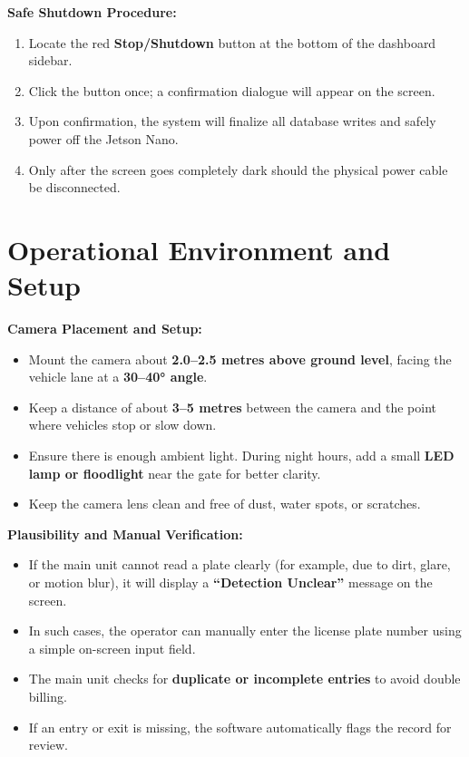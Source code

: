 \noindent\textbf{Safe Shutdown Procedure:}
\begin{enumerate}
	\item Locate the red \textbf{Stop/Shutdown} button at the bottom of the dashboard sidebar.
	\item Click the button once; a confirmation dialogue will appear on the screen.
	\item Upon confirmation, the system will finalize all database writes and safely power off the Jetson Nano.
	\item Only after the screen goes completely dark should the physical power cable be disconnected.
\end{enumerate}

\section{Operational Environment and Setup}
\noindent\textbf{Camera Placement and Setup:}
\begin{itemize}
	\item Mount the camera about \textbf{2.0–2.5 metres above ground level}, facing the vehicle lane at a \textbf{30–40° angle}.
	\item Keep a distance of about \textbf{3–5 metres} between the camera and the point where vehicles stop or slow down.
	\item Ensure there is enough ambient light. During night hours, add a small \textbf{LED lamp or floodlight} near the gate for better clarity.
	\item Keep the camera lens clean and free of dust, water spots, or scratches.
\end{itemize}

\textbf{Plausibility and Manual Verification:}
\begin{itemize}
	\item If the main unit cannot read a plate clearly (for example, due to dirt, glare, or motion blur), it will display a \textbf{“Detection Unclear”} message on the screen.
	\item In such cases, the operator can manually enter the license plate number using a simple on-screen input field.
	\item The main unit checks for \textbf{duplicate or incomplete entries} to avoid double billing.
	\item If an entry or exit is missing, the software automatically flags the record for review.
\end{itemize}

